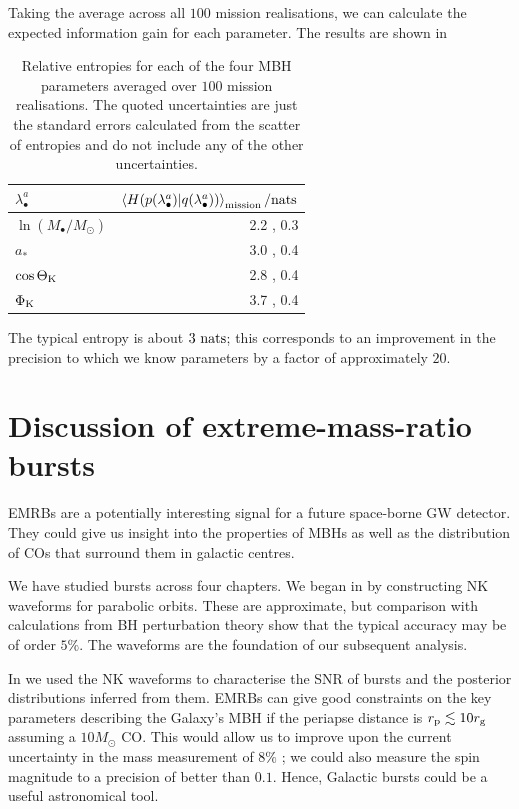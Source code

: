 Taking the average across all $100$ mission realisations, we can calculate the expected information gain for each parameter. The results are shown in 
\begin{table}\footnotesize
\centering
  \begin{tabular}{l D{,}{\,\pm\,}{3.3}}
  \toprule
  $\lambda_\bullet^a$ &  \\ \midrule
  $\ln(M_\bullet/M_\odot)$ & 2.2 , 0.3 \\
  $a_\ast$ & 3.0 , 0.4 \\
  $\cos\Theta_\mathrm{K}$ & 2.8 , 0.4  \\
  $\Phi_\mathrm{K}$ & 3.7 , 0.4 \\
  \bottomrule
\end{tabular}
  \caption{Relative entropies for each of the four MBH parameters averaged over $100$ mission realisations. The quoted uncertainties are just the standard errors calculated from the scatter of entropies and do not include any of the other uncertainties.}\label{tab:entropies}
\end{table}
The typical entropy is about $3 ~\mathrm{nats}$; this corresponds to an improvement in the precision to which we know parameters by a factor of approximately $20$.

\section{Discussion of extreme-mass-ratio bursts}\label{sec:EMRB-end}

EMRBs are a potentially interesting signal for a future space-borne GW detector. They could give us insight into the properties of MBHs as well as the distribution of COs that surround them in galactic centres.

We have studied bursts across four chapters. We began in  by constructing NK waveforms for parabolic orbits. These are approximate, but comparison with calculations from BH perturbation theory show that the typical accuracy may be of order $5\%$. The waveforms are the foundation of our subsequent analysis.

In  we used the NK waveforms to characterise the SNR of bursts and the posterior distributions inferred from them. EMRBs can give good constraints on the key parameters describing the Galaxy's MBH if the periapse distance is $r_\mathrm{p} \lesssim 10 r_\mathrm{g}$ assuming a $10 M_\odot$ CO. This would allow us to improve upon the current uncertainty in the mass measurement of $8\%$ \citep{Gillessen2009}; we could also measure the spin magnitude to a precision of better than $0.1$. Hence, Galactic bursts could be a useful astronomical tool.

